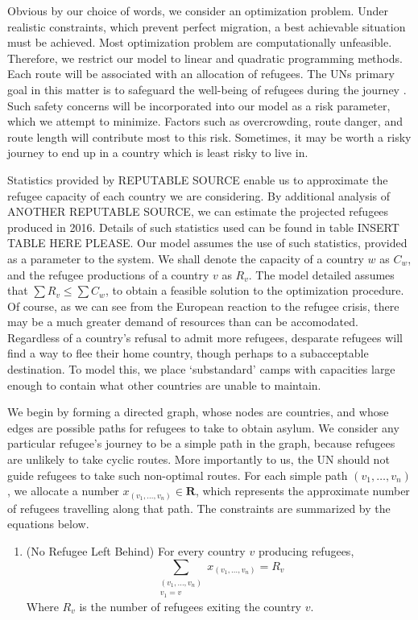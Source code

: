 \documentclass{article}
\begin{document}
\begin{enumerate}
Obvious by our choice of words, we consider an optimization problem. Under realistic constraints, which prevent perfect migration, a best achievable situation must be achieved. Most optimization problem are computationally unfeasible. Therefore, we restrict our model to linear and quadratic programming methods. Each route will be associated with an allocation of refugees. The UNs primary goal in this matter is to safeguard the well-being of refugees during the journey \cite{UNStatement}. Such safety concerns will be incorporated into our model as a risk parameter, which we attempt to minimize. Factors such as overcrowding, route danger, and route length will contribute most to this risk. Sometimes, it may be worth a risky journey to end up in a country which is least risky to live in.

Statistics provided by REPUTABLE SOURCE enable us to approximate the refugee capacity of each country we are considering. By additional analysis of ANOTHER REPUTABLE SOURCE, we can estimate the projected refugees produced in 2016. Details of such statistics used can be found in table INSERT TABLE HERE PLEASE. Our model assumes the use of such statistics, provided as a parameter to the system. We shall denote the capacity of a country $w$ as $C_w$, and the refugee productions of a country $v$ as $R_v$. The model detailed assumes that $\sum R_v \leq \sum C_w$, to obtain a feasible solution to the optimization procedure. Of course, as we can see from the European reaction to the refugee crisis, there may be a much greater demand of resources than can be accomodated. Regardless of a country's refusal to admit more refugees, desparate refugees will find a way to flee their home country, though perhaps to a subacceptable destination. To model this, we place `substandard' camps with capacities large enough to contain what other countries are unable to maintain.

We begin by forming a directed graph, whose nodes are countries, and whose edges are possible paths for refugees to take to obtain asylum. We consider any particular refugee's journey to be a simple path in the graph, because refugees are unlikely to take cyclic routes. More importantly to us, the UN should not guide refugees to take such non-optimal routes. For each simple path $(v_1, \dots, v_n)$, we allocate a number $x_{(v_1, \dots, v_n)} \in \mathbf{R}$, which represents the approximate number of refugees travelling along that path. The constraints are summarized by the equations below.

\begin{enumerate}
    \item (No Refugee Left Behind) For every country $v$ producing refugees,
    \[ \sum_{\substack{(v_1, \dots, v_n) \\ v_1 = v}} x_{(v_1, \dots, v_n)} = R_v \]
    Where $R_v$ is the number of refugees exiting the country $v$.


\end{enumerate}
\end{enumerate}
\end{document}
